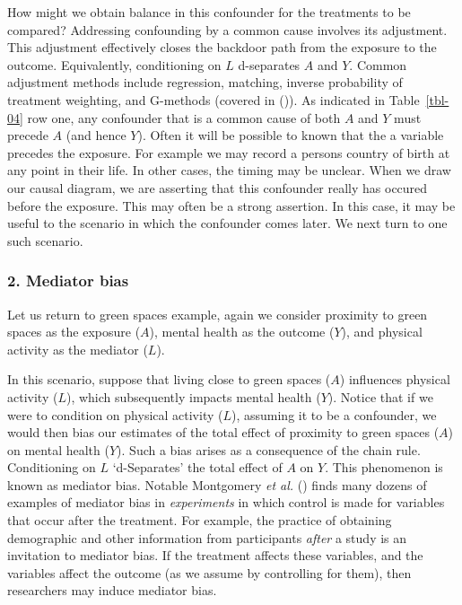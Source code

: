 \documentclass[
  singlecolumn]{article}
\begin{document}
How might we obtain balance in this confounder for the treatments to be
compared? Addressing confounding by a common cause involves its
adjustment. This adjustment effectively closes the backdoor path from
the exposure to the outcome. Equivalently, conditioning on \(L\)
d-separates \(A\) and \(Y\). Common adjustment methods include
regression, matching, inverse probability of treatment weighting, and
G-methods (covered in ()). As indicated in Table~\ref{tbl-04} row one, any confounder that
is a common cause of both \(A\) and \(Y\) must precede \(A\) (and hence
\(Y\)). Often it will be possible to known that the a variable precedes
the exposure. For example we may record a persons country of birth at
any point in their life. In other cases, the timing may be unclear. When
we draw our causal diagram, we are asserting that this confounder really
has occured before the exposure. This may often be a strong assertion.
In this case, it may be useful to the scenario in which the confounder
comes later. We next turn to one such scenario.

\subsubsection{2. Mediator bias}\label{mediator-bias}

Let us return to green spaces example, again we consider proximity to
green spaces as the exposure (\(A\)), mental health as the outcome
(\(Y\)), and physical activity as the mediator (\(L\)).

In this scenario, suppose that living close to green spaces (\(A\))
influences physical activity (\(L\)), which subsequently impacts mental
health (\(Y\)). Notice that if we were to condition on physical activity
(\(L\)), assuming it to be a confounder, we would then bias our
estimates of the total effect of proximity to green spaces (\(A\)) on
mental health (\(Y\)). Such a bias arises as a consequence of the chain
rule. Conditioning on \(L\) `d-Separates' the total effect of \(A\) on
\(Y\). This phenomenon is known as mediator bias. Notable Montgomery
\emph{et al.} () finds many dozens of
examples of mediator bias in \emph{experiments} in which control is made
for variables that occur after the treatment. For example, the practice
of obtaining demographic and other information from participants
\emph{after} a study is an invitation to mediator bias. If the treatment
affects these variables, and the variables affect the outcome (as we
assume by controlling for them), then researchers may induce mediator
bias.
\end{document}
